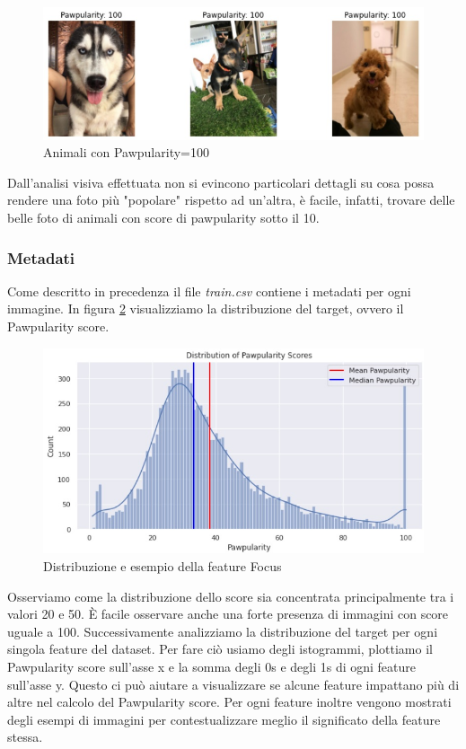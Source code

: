     \begin{figure}[H]
        \centering
        \includegraphics[scale=0.5]{Plot/pawpularity_100.jpg}
        \caption{Animali con Pawpularity=100}
        \label{fig:paw_100}
    \end{figure}

    Dall'analisi visiva effettuata non si evincono particolari dettagli su cosa possa rendere una foto più "popolare" rispetto ad un'altra, è facile, infatti, trovare delle belle foto di animali con score di pawpularity sotto il 10.

    \subsubsection{Metadati}
    Come descritto in precedenza il file \textit{train.csv} contiene i metadati per ogni immagine. In figura \ref{fig:target} visualizziamo la distribuzione del target, ovvero il Pawpularity score.
    \begin{figure}[H]
        \centering
        \includegraphics[scale=0.8]{Plot/distribution_target.jpg}
        \caption{Distribuzione e esempio della feature Focus}
        \label{fig:target}
    \end{figure}

    Osserviamo come la distribuzione dello score sia concentrata principalmente tra i valori 20 e 50. È facile osservare anche una forte presenza di immagini con score uguale a 100.
    Successivamente analizziamo la distribuzione del target per ogni singola feature del dataset.
    Per fare ciò usiamo degli istogrammi, plottiamo il Pawpularity score sull'asse x e la somma degli 0s e degli 1s di ogni feature sull'asse y. Questo ci può aiutare a visualizzare se alcune feature impattano più di altre nel calcolo del Pawpularity score. Per ogni feature inoltre vengono mostrati degli esempi di immagini per contestualizzare meglio il significato della feature stessa.

